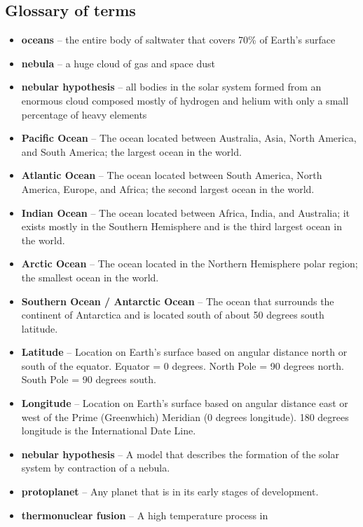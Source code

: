 \subsection{Glossary of terms}

\begin{itemize}
	\item \textbf{oceans} -- the entire body of saltwater that covers
		70\% of Earth's surface
	\item \textbf{nebula} -- a huge cloud of gas and space dust
	\item \textbf{nebular hypothesis} -- all bodies in the solar system
		formed from an enormous cloud composed mostly of hydrogen and
		helium with only a small percentage of heavy elements
	\item \textbf{Pacific Ocean} -- The ocean located between Australia,
		Asia, North America, and South America; the largest ocean in
		the world.
	\item \textbf{Atlantic Ocean} -- The ocean located between South
		America, North America, Europe, and Africa; the second largest
		ocean in the world.
	\item \textbf{Indian Ocean} -- The ocean located between Africa, India,
		and Australia; it exists mostly in the Southern Hemisphere
		and is the third largest ocean in the world.
	\item \textbf{Arctic Ocean} -- The ocean located in the Northern
		Hemisphere polar region; the smallest ocean in the world.
	\item \textbf{Southern Ocean / Antarctic Ocean} -- The ocean that
		surrounds the continent of Antarctica and is located south of
		about 50 degrees south latitude.
	\item \textbf{Latitude} -- Location on Earth's surface based on angular
		distance north or south of the equator. Equator = 0 degrees.
		North Pole = 90 degrees north. South Pole = 90 degrees south.
	\item \textbf{Longitude} -- Location on Earth's surface based on
		angular distance east or west of the Prime (Greenwhich)
		Meridian (0 degrees longitude). 180 degrees longitude is the
		International Date Line.
	\item \textbf{nebular hypothesis} -- A model that describes the
		formation of the solar system by contraction of a nebula.
	\item \textbf{protoplanet} -- Any planet that is in its early stages of
		development.
	\item \textbf{thermonuclear fusion} -- A high temperature process in

\end{itemize}
